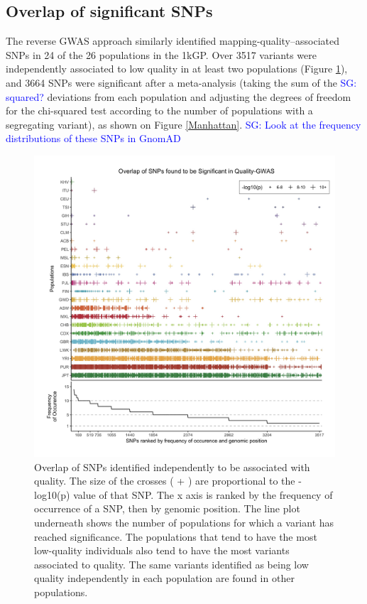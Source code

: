 \documentclass[9pt,lineno]{elife}
\newcommand{\sgcomment}[1]{\textcolor{blue}{SG: #1}}
\begin{document}
\subsection{Overlap of significant SNPs}
The reverse GWAS approach similarly identified mapping-quality--associated SNPs in 24 of the 26 populations in the 1kGP.
Over 3517 variants were independently associated to low quality in at least two populations  (Figure \ref{OverLap}), and 3664 SNPs were significant after a meta-analysis (taking the sum of the \sgcomment{squared?} deviations from each population and adjusting the degrees of freedom for the chi-squared test according to the number of populations with a segregating variant), as shown on Figure \ref{Manhattan}.  
\sgcomment{Look at the frequency distributions of these SNPs in GnomAD}

\begin{figure}
\includegraphics[width=\hsize,keepaspectratio]{./Figures/SNPOverlap6.jpg}

\caption{Overlap of SNPs identified independently to be associated with quality. 
The size of the crosses ( + ) are proportional to the -log10(p) value of that SNP.
The x axis is ranked by the frequency of occurrence of a SNP, then by genomic position.
The line plot underneath shows the number of populations for which a variant has reached significance.
The populations that tend to have the most low-quality individuals also tend to have the most variants associated to quality. 
The same variants identified as being low quality independently in each population are found in other populations. }
  \label{OverLap}
\end{figure}
\end{document}
